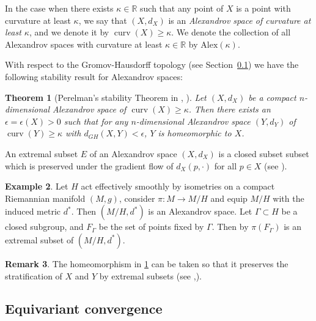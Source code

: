 \documentclass[12pt,a4paper,reqno]{amsart}
\newtheorem{theorem}{Theorem}[section]
\theoremstyle{definition}
\newtheorem{ex}[theorem]{Example}
\newtheorem{rmk}[theorem]{Remark}
\numberwithin{equation}{section}
\newcommand{\Alex}{\mathrm{Alex}}
\newcommand{\R}{\mathbb{R}} %
\DeclareMathOperator{\curv}{curv}
\begin{document}
In the case when there exists $\kappa\in \R$ such that any point of $X$ is a point with curvature at least $\kappa$, we say that $(X,d_X)$ is an \emph{Alexandrov space of curvature at least $\kappa$}, and we denote it by $\curv(X)\geq \kappa$. We denote the collection of all Alexandrov spaces with curvature at least $\kappa\in \R$ by $\Alex(\kappa)$.

With respect to the Gromov-Hausdorff topology (see Section~\ref{S: equivariant convergence}) we have the following stability result for Alexandrov spaces:

\begin{theorem}[Perelman's stability Theorem in \cite{Perelman91}, \cite{Kapvitch2007}]\th\label{T: Perelmans stability}
Let $(X,d_X)$ be a compact $n$-dimensional Alexandrov space of $\curv(X) \geq \kappa$. Then there exists an $\epsilon = \epsilon(X) > 0$ such that for any $n$-dimensional Alexandrov space $(Y,d_Y)$ of $\curv(Y)\geq \kappa$ with $d_{GH}(X, Y) < \epsilon$, $Y$ is homeomorphic to $X$.
\end{theorem}

An extremal subset $E$ of an Alexandrov space $(X,d_X)$ is a closed subset subset which is preserved under the gradient flow of $d_X(p, \cdot)$ for all $p \in X$ (see \cite{HarveySearle2021}).

\begin{ex}\th\label{Ex: Orbit type stratification} Let $H$ act effectively smoothly by isometries on a compact Riemannian manifold $(M,g)$, consider $\pi\colon M\to M/H$ and equip $M/H$ with the induced metric $d^\ast$. Then $(M/H,d^\ast)$ is an Alexandrov space. Let $\Gamma\subset H$ be a closed subgroup, and $F_\Gamma$ be the set of points fixed by $\Gamma$. Then by \cite[4.2 Proposition]{PerelmanPetrunin1994} $\pi(F_\Gamma)$ is an extremal subset of $(M/H,d^\ast)$.
\end{ex}


\begin{rmk}\th\label{R: Perelman stability preserves stratification}
The homeomorphism in \th\ref{T: Perelmans stability} can be taken so that it preserves the stratification of $X$ and $Y$ by extremal subsets (see \cite{Kapvitch2007},\cite[Theorem 4.3]{HarveySearle2017}).
\end{rmk}



\subsection{Equivariant convergence}\label{S: equivariant convergence}
\end{document}
